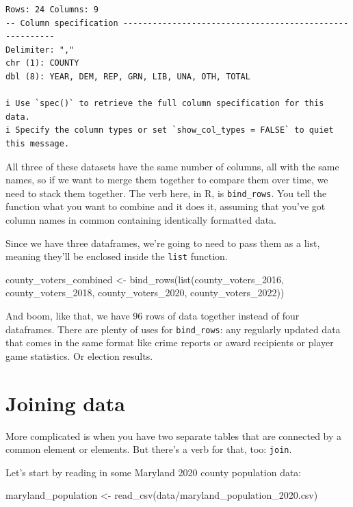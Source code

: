 \documentclass[
  letterpaper,
  DIV=11,
  numbers=noendperiod]{scrreprt}
\newenvironment{Shaded}{\begin{snugshade}}{\end{snugshade}}
\newcommand{\FunctionTok}[1]{\textcolor[rgb]{0.28,0.35,0.67}{#1}}
\newcommand{\NormalTok}[1]{\textcolor[rgb]{0.00,0.23,0.31}{#1}}
\newcommand{\OtherTok}[1]{\textcolor[rgb]{0.00,0.23,0.31}{#1}}
\newcommand{\StringTok}[1]{\textcolor[rgb]{0.13,0.47,0.30}{#1}}
\begin{document}
\begin{verbatim}
Rows: 24 Columns: 9
-- Column specification --------------------------------------------------------
Delimiter: ","
chr (1): COUNTY
dbl (8): YEAR, DEM, REP, GRN, LIB, UNA, OTH, TOTAL

i Use `spec()` to retrieve the full column specification for this data.
i Specify the column types or set `show_col_types = FALSE` to quiet this message.
\end{verbatim}

All three of these datasets have the same number of columns, all with
the same names, so if we want to merge them together to compare them
over time, we need to stack them together. The verb here, in R, is
\texttt{bind\_rows}. You tell the function what you want to combine and
it does it, assuming that you've got column names in common containing
identically formatted data.

Since we have three dataframes, we're going to need to pass them as a
list, meaning they'll be enclosed inside the \texttt{list} function.

\begin{Shaded}
\begin{Highlighting}[]
\NormalTok{county\_voters\_combined }\OtherTok{\textless{}{-}} \FunctionTok{bind\_rows}\NormalTok{(}\FunctionTok{list}\NormalTok{(county\_voters\_2016, county\_voters\_2018, county\_voters\_2020, county\_voters\_2022))}
\end{Highlighting}
\end{Shaded}

And boom, like that, we have 96 rows of data together instead of four
dataframes. There are plenty of uses for \texttt{bind\_rows}: any
regularly updated data that comes in the same format like crime reports
or award recipients or player game statistics. Or election results.

\hypertarget{joining-data}{%
\section{Joining data}\label{joining-data}}

More complicated is when you have two separate tables that are connected
by a common element or elements. But there's a verb for that, too:
\texttt{join}.

Let's start by reading in some Maryland 2020 county population data:

\begin{Shaded}
\begin{Highlighting}[]
\NormalTok{maryland\_population }\OtherTok{\textless{}{-}} \FunctionTok{read\_csv}\NormalTok{(}\StringTok{\textquotesingle{}data/maryland\_population\_2020.csv\textquotesingle{}}\NormalTok{)}
\end{Highlighting}
\end{Shaded}
\end{document}
